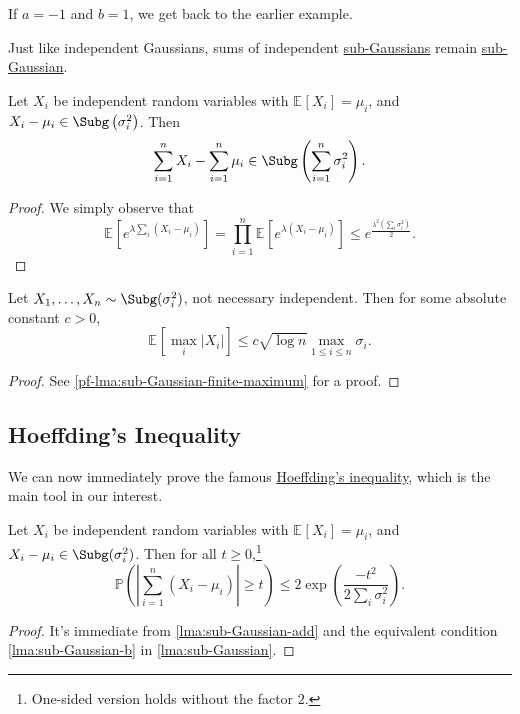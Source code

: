 \begin{note}
	If \(a = -1\) and \(b = 1\), we get back to the earlier example.
\end{note}

Just like independent Gaussians, sums of independent \hyperref[def:sub-Gaussian]{sub-Gaussians} remain \hyperref[def:sub-Gaussian]{sub-Gaussian}.

\begin{lemma}\label{lma:sub-Gaussian-add}
	Let \(X_i\) be independent random variables with \(\mathbb{E}_{}\left[X_i \right] = \mu _i\), and \(X_i - \mu _i \in \Subg\left( \sigma _i^2 \right)  \). Then
	\[
		\sum_{i=1}^n X_i - \sum_{i=1}^n \mu _i \in \Subg\left( \sum_{i=1}^n \sigma _i^2 \right) .
	\]
\end{lemma}
\begin{proof}
	We simply observe that
	\[
		\mathbb{E}_{}\left[e^{\lambda \sum_{i} (X_i - \mu _i)} \right]
		= \prod _{i=1}^n \mathbb{E}_{}\left[e^{\lambda (X_i - \mu _i)} \right]
		\leq e^{\frac{\lambda ^2 (\sum_{i} \sigma _i^2)}{2}}.
	\]
\end{proof}

\begin{lemma}\label{lma:sub-Gaussian-finite-maximum}
	Let \(X_1, \dots , X_n \sim \Subg(\sigma _i^{2} ) \), not necessary independent. Then for some absolute constant \(c > 0\),
	\[
		\mathbb{E}_{}\left[\max _i \vert X_i \vert \right] \leq c \sqrt{\log n} \max _{1 \leq i \leq n} \sigma _i.
	\]
\end{lemma}
\begin{proof}
	See \autoref{pf-lma:sub-Gaussian-finite-maximum} for a proof.
\end{proof}
\subsection{Hoeffding's Inequality}
We can now immediately prove the famous \hyperref[thm:Hoeffding-inequality]{Hoeffding's inequality}, which is the main tool in our interest.

\begin{theorem}\label{thm:Hoeffding-inequality}
	Let \(X_i\) be independent random variables with \(\mathbb{E}_{}\left[X_i \right] = \mu _i\), and \(X_i - \mu _i \in \Subg(\sigma _i^2) \). Then for all \(t \geq 0\),\footnote{One-sided version holds without the factor \(2\).}
	\[
		\mathbb{P} \left( \left\vert \sum_{i=1}^n (X_i - \mu _i) \right\vert \geq t \right) \leq 2 \exp (\frac{-t^2}{2 \sum_{i} \sigma _i^2}).
	\]
\end{theorem}
\begin{proof}
	It's immediate from \autoref{lma:sub-Gaussian-add} and the equivalent condition \autoref{lma:sub-Gaussian-b} in \autoref{lma:sub-Gaussian}.
\end{proof}